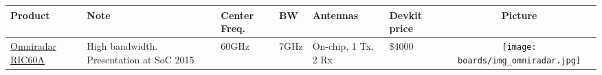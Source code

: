 

\newlength{\colwidthA} \setlength{\colwidthA}{0.1\textwidth}
\newlength{\colwidthB} \setlength{\colwidthB}{0.1\textwidth}
\newlength{\colwidthC} \setlength{\colwidthC}{0.1\textwidth}
\newlength{\colwidthD} \setlength{\colwidthD}{0.1\textwidth}
\newlength{\colwidthE} \setlength{\colwidthE}{0.1\textwidth}
\newlength{\colwidthF} \setlength{\colwidthF}{0.1\textwidth}
\newlength{\colwidthG} \setlength{\colwidthG}{0.1\textwidth}

\begin{longtable}[]{@{}llllllc@{}}

\begin{minipage}[b]{\colwidthA}\raggedright\strut
    Product
\strut\end{minipage} &
\begin{minipage}[b]{\colwidthB}\raggedright\strut
    Note
\strut\end{minipage} &
\begin{minipage}[b]{\colwidthC}\raggedright\strut
    Center Freq.
\strut\end{minipage} &
\begin{minipage}[b]{\colwidthD}\raggedright\strut
    BW
\strut\end{minipage} &
\begin{minipage}[b]{\colwidthE}\raggedright\strut
    Antennas
\strut\end{minipage} &
\begin{minipage}[b]{\colwidthF}\raggedright\strut
    Devkit price
\strut\end{minipage} &
\begin{minipage}[b]{\colwidthG}\centering\strut
    Picture
\strut\end{minipage}\tabularnewline
\midrule
\endhead



\begin{minipage}[t]{\colwidthA}\raggedright\strut
	\href{https://www.omniradar.com/products/}{Omniradar RIC60A}
\strut\end{minipage} &
\begin{minipage}[t]{\colwidthB}\raggedright\strut
High bandwidth. Presentation at SoC 2015\cite{Brouwer2015}
\strut\end{minipage} &
\begin{minipage}[t]{\colwidthC}\raggedright\strut
60GHz
\strut\end{minipage} &
\begin{minipage}[t]{\colwidthD}\raggedright\strut
7GHz
\strut\end{minipage} &
\begin{minipage}[t]{\colwidthE}\raggedright\strut
On-chip, 1 Tx, 2 Rx
\strut\end{minipage} &
\begin{minipage}[t]{\colwidthF}\raggedright\strut
\$4000
\strut\end{minipage} &
\begin{minipage}[t]{\colwidthG}\centering\strut
\texttt{[image: boards/img\_omniradar.jpg]}
\strut\end{minipage}\tabularnewline


\end{longtable}
